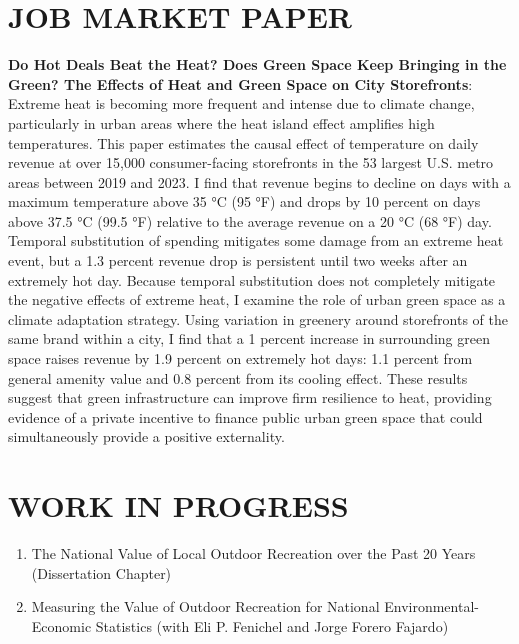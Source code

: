 \documentclass[11pt]{article}
\begin{document}
\section*{JOB MARKET PAPER}
\textbf{Do Hot Deals Beat the Heat? Does Green Space Keep Bringing in the Green? The Effects of Heat and Green Space on City Storefronts}: Extreme heat is becoming more frequent and intense due to climate change, particularly in urban areas where the heat island effect amplifies high temperatures. This paper estimates the causal effect of temperature on daily revenue at over 15,000 consumer-facing storefronts in the 53 largest U.S. metro areas between 2019 and 2023. I find that revenue begins to decline on days with a maximum temperature above 35 °C (95 °F) and drops by 10 percent on days above 37.5 °C (99.5 °F) relative to the average revenue on a 20 °C (68 °F) day. Temporal substitution of spending mitigates some damage from an extreme heat event, but a 1.3 percent revenue drop is persistent until two weeks after an extremely hot day. Because temporal substitution does not completely mitigate the negative effects of extreme heat, I examine the role of urban green space as a climate adaptation strategy. Using variation in greenery around storefronts of the same brand within a city, I find that a 1 percent increase in surrounding green space raises revenue by 1.9 percent on extremely hot days: 1.1 percent from general amenity value and 0.8 percent from its cooling effect. These results suggest that green infrastructure can improve firm resilience to heat, providing evidence of a private incentive to finance public urban green space that could simultaneously provide a positive externality. 

\section*{WORK IN PROGRESS}
\begin{enumerate}[left=0pt]
    \item The National Value of Local Outdoor Recreation over the Past 20 Years (Dissertation Chapter)
    \item Measuring the Value of Outdoor Recreation for National Environmental-Economic Statistics (with Eli P. Fenichel and Jorge Forero Fajardo)
\end{enumerate}
\end{document}
